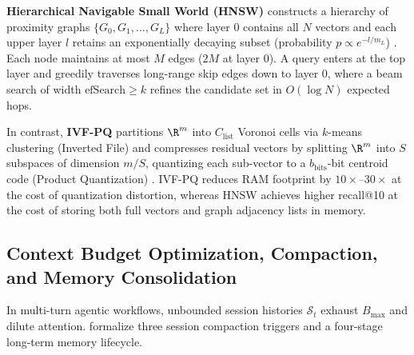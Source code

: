 \documentclass[../../../../master.tex]{subfiles}
\begin{document}
\begin{intuition}
\textbf{Hierarchical Navigable Small World (HNSW)} constructs a hierarchy of proximity graphs $\{G_0, G_1, \dots, G_L\}$ where layer $0$ contains all $N$ vectors and each upper layer $l$ retains an exponentially decaying subset (probability $p \propto e^{-l / m_L}$) . Each node maintains at most $M$ edges ($2M$ at layer $0$). A query enters at the top layer and greedily traverses long-range skip edges down to layer $0$, where a beam search of width $\text{efSearch} \ge k$ refines the candidate set in $O(\log N)$ expected hops.

In contrast, \textbf{IVF-PQ} partitions $\R^m$ into $C_{\mathrm{list}}$ Voronoi cells via $k$-means clustering (Inverted File) and compresses residual vectors by splitting $\R^m$ into $S$ subspaces of dimension $m/S$, quantizing each sub-vector to a $b_{\mathrm{bits}}$-bit centroid code (Product Quantization) . IVF-PQ reduces RAM footprint by $10\times$--$30\times$ at the cost of quantization distortion, whereas HNSW achieves higher recall@10 at the cost of storing both full vectors and graph adjacency lists in memory.
\end{intuition}

\subsection{Context Budget Optimization, Compaction, and Memory Consolidation}
\label{sec:rag:memory_math}

In multi-turn agentic workflows, unbounded session histories $\mathcal{S}_t$ exhaust $B_{\max}$ and dilute attention.  formalize three session compaction triggers and a four-stage long-term memory lifecycle.
\end{document}

